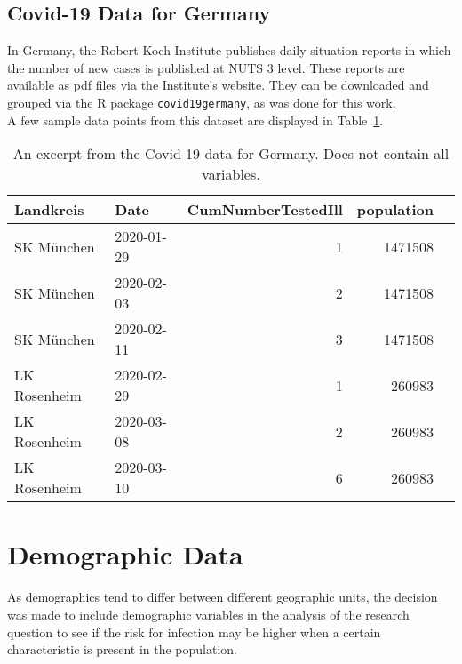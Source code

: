 \subsection*{Covid-19 Data for Germany}
In Germany, the Robert Koch Institute publishes daily situation reports in which the number of new cases is published at NUTS 3 level. These reports are available as pdf files via the Institute's website. They can be downloaded and grouped via the R package \texttt{covid19germany}\cite{covid19germany}, as was done for this work.\\
A few sample data points from this dataset are displayed in Table~\ref{datasetGermany}.\\
\begin{table}[H] 
\caption{An excerpt from the Covid-19 data for Germany. Does not contain all variables.\label{datasetGermany}}
\begin{tabular}{l l r r r}
\toprule
\textbf{Landkreis}	& \textbf{Date}	& \textbf{CumNumberTestedIll} & \textbf{population}\\
\midrule
SK München & 2020-01-29 & 1 & 1471508\\
SK München & 2020-02-03 & 2 & 1471508\\
SK München & 2020-02-11 & 3 & 1471508\\
LK Rosenheim & 2020-02-29 & 1 & 260983\\
LK Rosenheim & 2020-03-08 & 2 & 260983 \\
LK Rosenheim & 2020-03-10 & 6 & 260983 \\
\bottomrule
\end{tabular}
\end{table}
\clearpage
\section{Demographic Data}
As demographics tend to differ between different geographic units, the decision was made to include demographic variables in the analysis of the research question to see if the risk for infection may be higher when a certain characteristic is present in the population.
